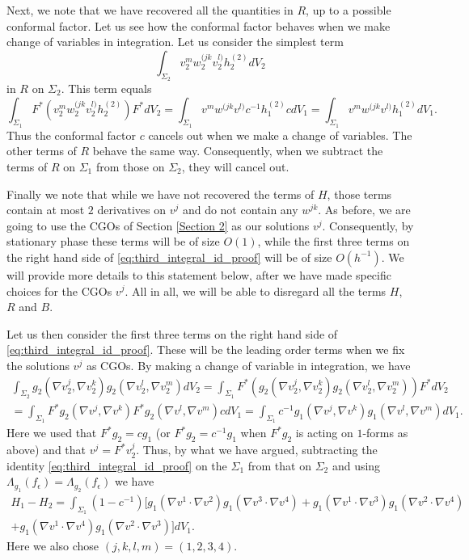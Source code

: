 \documentclass[12pt]{amsart}
\theoremstyle{definition}
\theoremstyle{remark}
\begin{document}
Next, we note that we have recovered all the quantities in $R$, up to a possible conformal factor. Let us see how the conformal factor behaves when we make change of variables in integration. Let us consider the simplest term
\[
 \int_{\Sigma_2} v_2^mw_2^{(jk}v_2^{l)}h_2^{(2)}dV_2
\]
in $R$ on $\Sigma_2$. This term equals
\[
 \int_{\Sigma_1} F^*(v_2^mw_2^{(jk}v_2^{l)}h_2^{(2)})F^*dV_2=\int_{\Sigma_1} v^mw^{(jk}v^{l)}c^{-1}h_1^{(2)}cdV_1=\int_{\Sigma_1} v^mw^{(jk}v^{l)}h_1^{(2)}dV_1.
\]
Thus the conformal factor $c$ cancels out when we make a change of variables. The other terms of $R$ behave the same way. Consequently, when we subtract the terms of $R$ on $\Sigma_1$ from those on $\Sigma_2$, they will cancel out.

Finally we note that while we have not recovered the terms of $H$, those terms contain at most $2$ derivatives on $v^j$ and do not  contain any $w^{jk}$. As before, we are going to use the CGOs of Section \ref{Section 2} as our solutions $v^j$. Consequently, by stationary phase these terms will be of size $O(1)$, while the first three terms on the right hand side of \eqref{eq:third_integral_id_proof} will be of size $O(h^{-1})$. We will provide more details to this statement below, after we have made specific choices for the CGOs $v^j$. All in all, we will be able to disregard all the terms $H$, $R$ and $B$.

Let us then consider the first three terms on the right hand side of \eqref{eq:third_integral_id_proof}. These will be the leading order terms when we fix the solutions $v^j$ as CGOs. By making a change of variable in integration, we have 
\begin{multline*}
 \int_{\Sigma_2}g_2(\nabla v_2^{j},\nabla v_2^k)g_2(\nabla v_2^{l},\nabla v_2^m) dV_2=\int_{\Sigma_1}F^*\left(g_2(\nabla v_2^{j},\nabla v_2^k)g_2(\nabla v_2^{l},\nabla v_2^m)\right) F^*dV_2   \\
 =\int_{\Sigma_1}F^*g_2(\nabla v^{j},\nabla v^k)F^*g_2(\nabla v^{l},\nabla v^m)cdV_1=\int_{\Sigma_1}c^{-1}g_1(\nabla v^{j},\nabla v^k)g_1(\nabla v^{l},\nabla v^m)dV_1.
\end{multline*}
Here we used that $F^*g_2=cg_1$ (or $F^*g_2=c^{-1}g_1$ when $F^*g_2$ is acting on $1$-forms as above) and that $v^j=F^*v_2^j$. Thus, by what we have argued, subtracting the identity \eqref{eq:third_integral_id_proof} on the $\Sigma_1$ from that on $\Sigma_2$ and using $\Lambda_{g_1} (f_\epsilon) =\Lambda_{g_2} (f_\epsilon)$ we have
\begin{multline}\label{eq:withH1H2}
H_1-H_2=\int_{\Sigma_1}(1-c^{-1}) \Big[g_1(\nabla v^1\cdot \nabla v^2)g_1(\nabla v^3\cdot \nabla  v^4)+g_1(\nabla v^1\cdot \nabla v^3)g_1(\nabla v^2\cdot \nabla  v^4) \\
 +g_1(\nabla v^1\cdot \nabla v^4)g_1(\nabla v^2\cdot \nabla  v^3)\Big]dV_1.
 \end{multline}
 Here we also chose $(j,k,l,m)=(1,2,3,4)$. 
\end{document}
